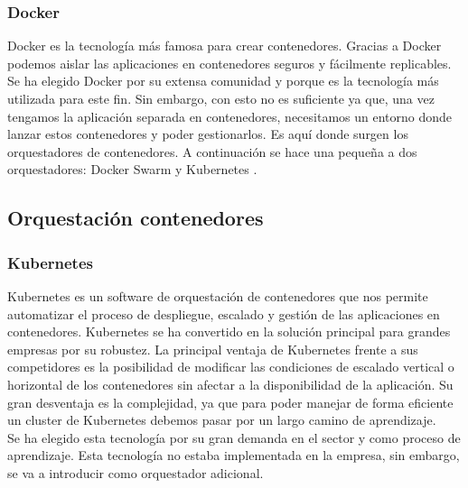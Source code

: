 		\subsubsection{Docker}
		\begin{text}
			Docker es la tecnología más famosa para crear contenedores. Gracias a Docker podemos aislar las aplicaciones en contenedores seguros y fácilmente replicables. Se ha elegido Docker por su extensa comunidad y porque es la tecnología más utilizada para este fin. Sin embargo, con esto no es suficiente ya que, una vez tengamos la aplicación separada en contenedores, necesitamos un entorno donde lanzar estos contenedores y poder gestionarlos. Es aquí donde surgen los orquestadores de contenedores. A continuación se hace una pequeña a dos orquestadores: Docker Swarm \cite{swarm:online} y Kubernetes \cite{k8:online}.
		\end{text}
	\subsection{Orquestación contenedores}
		\subsubsection{Kubernetes}
		\begin{text}
			Kubernetes es un software de orquestación de contenedores que nos permite automatizar el proceso de despliegue, escalado y gestión de las aplicaciones en contenedores. Kubernetes se ha convertido en la solución principal para grandes empresas por su robustez. La principal ventaja de Kubernetes frente a sus competidores es la posibilidad de modificar las condiciones de escalado vertical o horizontal de los contenedores sin afectar a la disponibilidad de la aplicación. Su gran desventaja es la complejidad, ya que para poder manejar de forma eficiente un cluster de Kubernetes debemos pasar por un largo camino de aprendizaje. \\
			Se ha elegido esta tecnología por su gran demanda en el sector y como proceso de aprendizaje. Esta tecnología no estaba implementada en la empresa, sin embargo, se va a introducir como orquestador adicional.
		\end{text}

